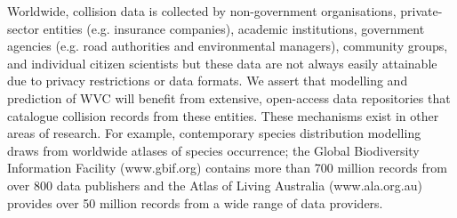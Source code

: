 
Worldwide, collision data is collected by non-government organisations, private-sector entities (e.g. insurance companies), academic institutions, government agencies (e.g. road authorities and environmental managers), community groups, and individual citizen scientists but these data are not always easily attainable due to privacy restrictions or data formats. We assert that modelling and prediction of WVC will benefit from extensive, open-access data repositories that catalogue collision records from these entities. These mechanisms exist in other areas of research. For example, contemporary species distribution modelling draws from worldwide atlases of species occurrence; the Global Biodiversity Information Facility (www.gbif.org) contains more than 700 million records from over 800 data publishers and the Atlas of Living Australia (www.ala.org.au) provides over 50 million records from a wide range of data providers.

